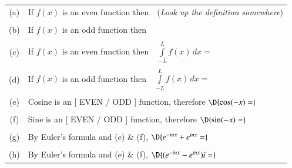 \documentclass[11pt]{article}
\begin{document}
\vspace{0.1cm}

\setlength{\extrarowheight}{-0.0cm}
\begin{tabular}{cl}
	(a) & If $f(x)$ is an even function then \,\, \UL{$\hspace{3.0cm}$} ({\em Look up the definition somewhere}) \\
	\\
	(b) & If $f(x)$ is an odd function then \,\, \UL{$\hspace{3.0cm}$} \\
	\\
	(c) & If $f(x)$ is an even function then \,\, $\int \limits_{-L}^{L} f(x) \, dx = $\\
	\\
	(d) & If $f(x)$ is an odd function then \,\, $\int \limits_{-L}^{L} f(x) \, dx = $ \\
	\\
	(e) & Cosine is an [ EVEN / ODD ] function, therefore $\D{\cos (-x) = }$ \\
	\\
	(f) & Sine is an [ EVEN / ODD ] function, therefore $\D{\sin (-x) = }$ \\
	\\
	(g) & By Euler's formula and (e) \& (f), $\D{e^{-inx}+e^{inx} = }$ \\
	\\
	(h) & By Euler's formula and (e) \& (f), $\D{(e^{-inx}-e^{inx})i = }$ \\
\end{tabular}
\end{document}
